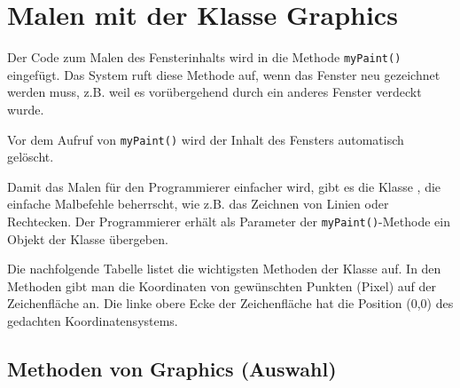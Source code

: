 \section{Malen mit der Klasse Graphics}

Der Code zum Malen des Fensterinhalts wird in die Methode \lstinline|myPaint()|
eingefügt. Das System ruft diese Methode auf, wenn das Fenster neu gezeichnet
werden muss, z.B. weil es vorübergehend durch ein anderes Fenster verdeckt
wurde. 

Vor dem Aufruf von \lstinline|myPaint()| wird der Inhalt des Fensters
automatisch gelöscht.

Damit das Malen für den Programmierer einfacher wird, gibt es die Klasse
, die einfache Malbefehle beherrscht, wie z.B. das Zeichnen
von Linien oder Rechtecken. Der Programmierer erhält als Parameter der
\lstinline|myPaint()|-Methode ein Objekt der Klasse 
übergeben.

Die nachfolgende Tabelle listet die wichtigsten Methoden der Klasse
 auf. In den Methoden gibt man die Koordinaten von gewünschten
Punkten (Pixel) auf der Zeichenfläche an. Die linke obere Ecke der
Zeichenfläche hat die Position (0,0) des gedachten Koordinatensystems.

\subsection{Methoden von Graphics (Auswahl)}

